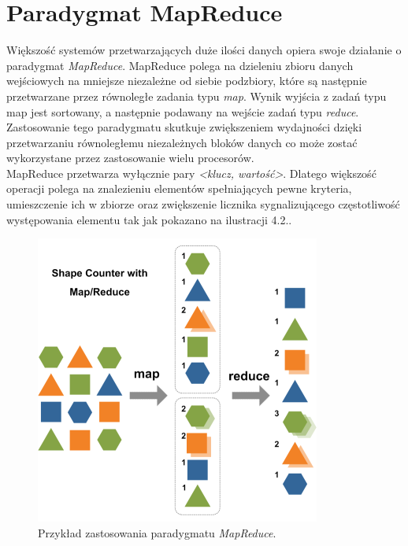 \section{Paradygmat MapReduce}
Większość systemów przetwarzających duże ilości danych opiera swoje działanie o paradygmat \textit{MapReduce}. MapReduce polega na dzieleniu zbioru danych wejściowych na mniejsze niezależne od siebie podzbiory, które są następnie przetwarzane przez równoległe zadania typu \textit{map}. Wynik wyjścia z zadań typu map jest sortowany, a następnie podawany na wejście zadań typu \textit{reduce}. Zastosowanie tego paradygmatu skutkuje zwiększeniem wydajności dzięki przetwarzaniu równoległemu niezależnych bloków danych co może zostać wykorzystane przez zastosowanie wielu procesorów.\\
MapReduce przetwarza wyłącznie pary \textit{<klucz, wartość>}. Dlatego większość operacji polega na znalezieniu elementów spełniających pewne kryteria, umieszczenie ich w zbiorze oraz zwiększenie licznika sygnalizującego częstotliwość występowania elementu tak jak pokazano na ilustracji 4.2..

\begin{figure}[h] %
	\centering
	\includegraphics[width=0.6\linewidth]{img/big_data_mapreduce}
	\caption{Przykład zastosowania paradygmatu \textit{MapReduce}.}
\end{figure}

